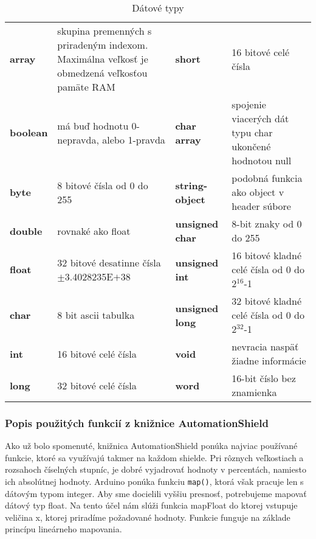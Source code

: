 \begin{table}[!ht]
	\centering
	\begin{tabular}{|p{} | p{} |p{} |p{} |}
		\hline
		\thead{dátový typ} & \thead{vlastnosti} & \thead{dátový typ} & \thead{vlastnosti} \\ \hline
		\textbf{array} & skupina premenných s priradeným indexom. Maximálna veľkosť je obmedzená veľkosťou pamäte RAM & \textbf{short }& 16 bitové celé čísla \\ \hline
		\textbf{boolean} & má buď hodnotu 0-nepravda, alebo 1-pravda & \textbf{char array }& spojenie viacerých dát typu char ukončené hodnotou null \\\hline
		\textbf{byte} & 8 bitové čísla od 0 do 255 & \textbf{string-object} & podobná funkcia ako object v header súbore \\ \hline
		\textbf{double} & rovnaké ako float & \textbf{unsigned char} & 8-bit znaky od 0 do 255 \\ \hline
		\textbf{float} & 32 bitové desatinne čísla $\pm$3.4028235E$+38$ & \textbf{unsigned int }& 16 bitové kladné celé čísla od 0 do 2$^{16}$-1 \\\hline
		\textbf{char} & 8 bit ascii tabulka & \textbf{unsigned long} & 32 bitové kladné celé čísla od 0 do 2$^{32}$-1 \\\hline
		\textbf{int} & 16 bitové celé čísla & \textbf{void }& nevracia naspäť žiadne informácie \\ \hline
		\textbf{long }& 32 bitové celé čísla & \textbf{word} & 16-bit číslo bez znamienka \\ \hline
    \end{tabular}
\caption{Dátové typy}
\label{tabulka typov}
\end{table}

\subsubsection{Popis použitých funkcií z knižnice AutomationShield}

Ako už bolo spomenuté, knižnica AutomationShield ponúka najviac používané funkcie, ktoré sa využívajú takmer na každom shielde. Pri rôznych veľkostiach a rozsahoch číselných stupníc, je dobré vyjadrovať hodnoty v percentách, namiesto ich absolútnej hodnoty. Arduino ponúka funkciu \verb|map()|, ktorá však pracuje len s dátovým typom integer. Aby sme docielili vyššiu presnosť, potrebujeme mapovať dátový typ float. Na tento účel nám slúži funkcia mapFloat do ktorej vstupuje veličina x, ktorej priradíme požadované hodnoty. Funkcie funguje na základe princípu lineárneho mapovania\cite{linearMap}.  

